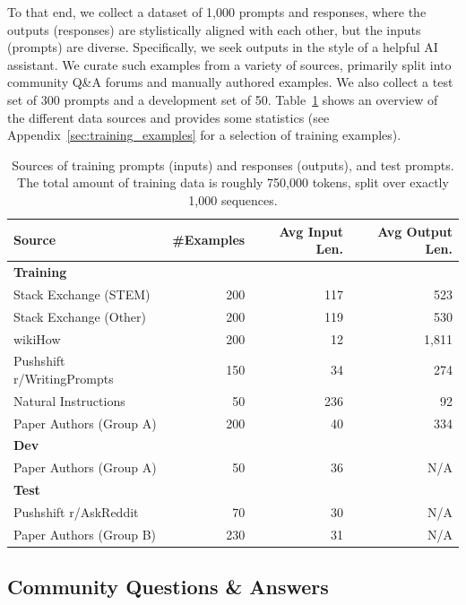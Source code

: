 \documentclass{article}
\begin{document}
To that end, we collect a dataset of 1,000 prompts and responses, where the outputs (responses) are stylistically aligned with each other, but the inputs (prompts) are diverse.
Specifically, we seek outputs in the style of a helpful AI assistant.
We curate such examples from a variety of sources, primarily split into community Q\&A forums and manually authored examples.
We also collect a test set of 300 prompts and a development set of 50.
Table~\ref{tab:data_sources} shows an overview of the different data sources and provides some statistics (see Appendix~\ref{sec:training_examples} for a selection of training examples).

\begin{table}[t]
    \small
    \centering
    \begin{tabular}{@{}lrrr@{}}
        \toprule
        \textbf{Source} & \textbf{\#Examples} & \textbf{Avg Input Len.} & \textbf{Avg Output Len.} \\
        \midrule
        \textbf{Training} & & & \\
        \quad Stack Exchange (STEM) & 200 & 117 & 523\\
        \quad Stack Exchange (Other) & 200 & 119 & 530 \\
        \quad wikiHow & 200 & 12 & 1,811 \\
        \quad Pushshift r/WritingPrompts & 150 & 34 & 274 \\
        \quad Natural Instructions & 50 & 236 & 92\\
        \quad Paper Authors (Group A) & 200 & 40 & 334 \\
        \midrule
        \textbf{Dev} & & & \\
        \quad Paper Authors (Group A) & 50 & 36 & N/A \\
        \midrule
        \textbf{Test} & & & \\
        \quad Pushshift r/AskReddit & 70 & 30 & N/A \\
        \quad Paper Authors (Group B) & 230 & 31 & N/A \\
        \bottomrule
    \end{tabular}
    \caption{Sources of training prompts (inputs) and responses (outputs), and test prompts. The total amount of training data is roughly 750,000 tokens, split over exactly 1,000 sequences.}
    \label{tab:data_sources}
\end{table}

\subsection{Community Questions \& Answers}
\label{sec:community_data}
\end{document}
